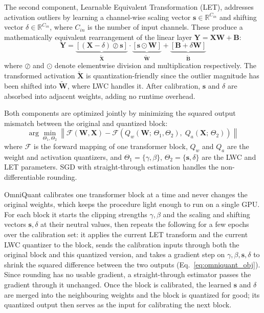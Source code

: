 The second component, Learnable Equivalent Transformation (LET), addresses activation outliers by learning a channel-wise scaling vector $\mathbf{s} \in \mathbb{R}^{C_{in}}$ and shifting vector $\delta \in \mathbb{R}^{C_{in}}$, where $C_{in}$ is the number of input channels. These produce a mathematically equivalent rearrangement of the linear layer $\mathbf{Y} = \mathbf{X}\mathbf{W} + \mathbf{B}$:
\begin{equation}
\mathbf{Y} = \underbrace{[(\mathbf{X} - \delta) \oslash \mathbf{s}]}_{\tilde{\mathbf{X}}} \cdot \underbrace{[\mathbf{s} \odot \mathbf{W}]}_{\tilde{\mathbf{W}}} + \underbrace{[\mathbf{B} + \delta\mathbf{W}]}_{\tilde{\mathbf{B}}}
\end{equation}
where $\oslash$ and $\odot$ denote elementwise division and multiplication respectively. The transformed activation $\tilde{\mathbf{X}}$ is quantization-friendly since the outlier magnitude has been shifted into $\tilde{\mathbf{W}}$, where LWC handles it. After calibration, $\mathbf{s}$ and $\delta$ are absorbed into adjacent weights, adding no runtime overhead.

Both components are optimized jointly by minimizing the squared output mismatch between the original and quantized block:
\begin{equation}
\arg\min_{\Theta_1, \Theta_2} \left\|\mathcal{F}(\mathbf{W}, \mathbf{X}) - \mathcal{F}\!\left(Q_w(\mathbf{W};\,\Theta_1,\Theta_2),\; Q_a(\mathbf{X};\,\Theta_2)\right)\right\|
\label{eq:omniquant_obj}
\end{equation}
where $\mathcal{F}$ is the forward mapping of one transformer block, $Q_w$ and $Q_a$ are the weight and activation quantizers, and $\Theta_1 = \{\gamma,\beta\}$, $\Theta_2 = \{\mathbf{s},\delta\}$ are the LWC and LET parameters. SGD with straight-through estimation handles the non-differentiable rounding.

OmniQuant calibrates one transformer block at a time and never changes the original weights, which keeps the procedure light enough to run on a single GPU. For each block it starts the clipping strengths $\gamma,\beta$ and the scaling and shifting vectors $\mathbf{s},\delta$ at their neutral values, then repeats the following for a few epochs over the calibration set: it applies the current LET transform and the current LWC quantizer to the block, sends the calibration inputs through both the original block and this quantized version, and takes a gradient step on $\gamma,\beta,\mathbf{s},\delta$ to shrink the squared difference between the two outputs (Eq.~\ref{eq:omniquant_obj}). Since rounding has no usable gradient, a straight-through estimator passes the gradient through it unchanged. Once the block is calibrated, the learned $\mathbf{s}$ and $\delta$ are merged into the neighbouring weights and the block is quantized for good; its quantized output then serves as the input for calibrating the next block.

